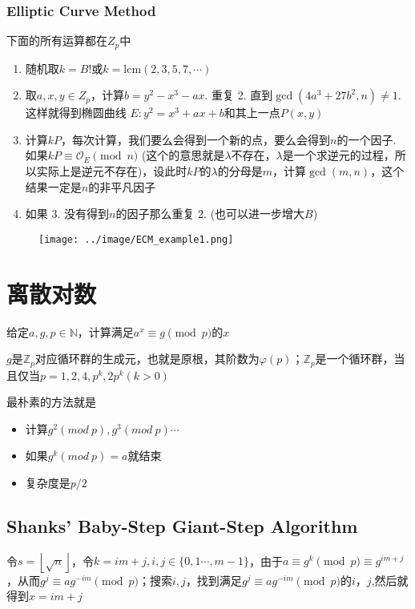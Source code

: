 \documentclass{article}
\begin{document}
\subsubsection{Elliptic Curve Method}

下面的所有运算都在$Z_p$中

\begin{enumerate}
    \item 随机取$k=B!$或$k=\mathrm{lcm}(2,3,5,7,\cdots)$
    \item 取$a,x,y\in Z_p$，计算$b=y^2-x^3-ax$. 重复 2. 直到$\gcd(4a^3+27b^2,n)\neq 1$. 这样就得到椭圆曲线 $E: y^2=x^3+ax+b$和其上一点$P(x,y)$
    \item 计算$kP$，每次计算，我们要么会得到一个新的点，要么会得到$n$的一个因子. 如果$kP\equiv \mathcal{O}_E\pmod{n}$ (这个的意思就是$\lambda$不存在，$\lambda$是一个求逆元的过程，所以实际上是逆元不存在)，设此时$kP$的$\lambda$的分母是$m$，计算$\gcd(m,n)$，这个结果一定是$n$的非平凡因子
    \item 如果 3. 没有得到$n$的因子那么重复 2. (也可以进一步增大$B$)
\end{enumerate}

\begin{figure}[h]
    \centering
    \texttt{[image: ../image/ECM\_example1.png]}
\end{figure}

\section{离散对数}

给定$a,g,p\in\mathbb{N}$，计算满足$a^x\equiv g\pmod{p}$的$x$


$g$是$\mathbb{Z}_p$对应循环群的生成元，也就是原根，其阶数为$\varphi(p)$；$\mathbb{Z}_p$是一个循环群，当且仅当$p=1,2,4,p^k,2p^k(k>0)$

最朴素的方法就是

\begin{itemize}
    \item 计算$g^2(mod~p),g^3(mod~p)\cdots$
    \item 如果$g^k(mod~p)=a$就结束
    \item 复杂度是$p/2$
\end{itemize}

\subsection{Shanks' Baby-Step Giant-Step Algorithm}

令$s=\left\lfloor\sqrt{n}\right\rfloor$，令$k=im+j,i,j\in\{0,1\cdots,m-1\}$，由于$a\equiv g^k\pmod{p}\equiv g^{im+j}$，从而$g^j\equiv ag^{-im}\pmod{p}$；搜索$i,j$，找到满足$g^j\equiv ag^{-im}\pmod{p}$的$i，j$,然后就得到$x=im+j$
\end{document}
